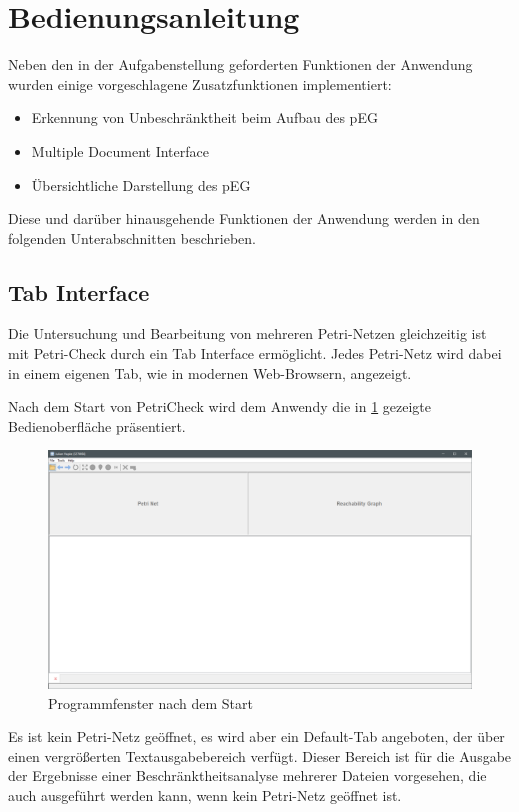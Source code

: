 \section{Bedienungsanleitung}
Neben den in der Aufgabenstellung geforderten Funktionen der Anwendung wurden
einige vorgeschlagene Zusatzfunktionen implementiert:
\begin{itemize}
  \item Erkennung von Unbeschränktheit beim Aufbau des pEG
  \item Multiple Document Interface
  \item Übersichtliche Darstellung des pEG
\end{itemize}
Diese und darüber hinausgehende Funktionen der Anwendung werden in den folgenden
Unterabschnitten beschrieben.

\subsection{Tab Interface}
Die Untersuchung und Bearbeitung von mehreren Petri-Netzen gleichzeitig ist mit
Petri-Check durch ein Tab Interface ermöglicht. Jedes Petri-Netz wird dabei in
einem eigenen Tab, wie in modernen Web-Browsern, angezeigt.

Nach dem Start von PetriCheck wird dem Anwendy die in \cref{img:default_window}
gezeigte Bedienoberfläche präsentiert.

\begin{figure}[H]
  \includegraphics[width=\textwidth]{../img/default_window.png}
  \caption{Programmfenster nach dem Start}
  \label{img:default_window}
\end{figure}

Es ist kein Petri-Netz geöffnet, es wird aber ein Default-Tab angeboten, der
über einen vergrößerten Textausgabebereich verfügt. Dieser Bereich ist für die
Ausgabe der Ergebnisse einer Beschränktheitsanalyse mehrerer Dateien vorgesehen,
die auch ausgeführt werden kann, wenn kein Petri-Netz geöffnet ist.

